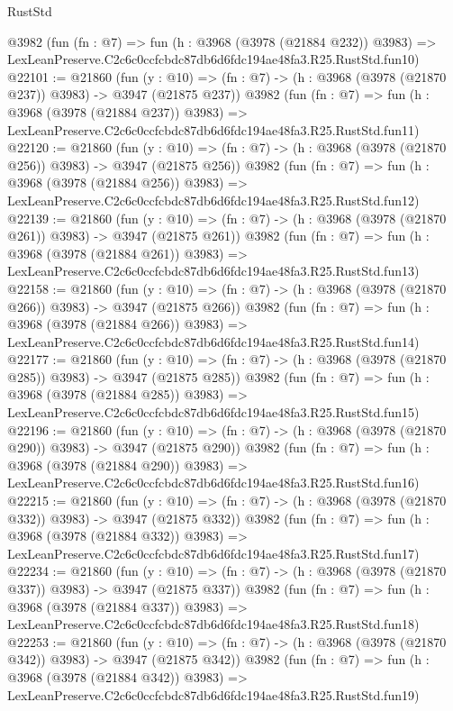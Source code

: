 \begin{lexlean}{RustStd}
\begin{coremodule}
    @3982
    (fun (fn : @7) =>
    fun (h : @3968 (@3978 (@21884 @232)) @3983) =>
    LexLeanPreserve.C2c6c0ccfcbdc87db6d6fdc194ae48fa3.R25.RustStd.fun10)
@22101 := @21860
    (fun (y : @10) => (fn : @7) -> (h : @3968 (@3978 (@21870 @237)) @3983) -> @3947 (@21875 @237))
    @3982
    (fun (fn : @7) =>
    fun (h : @3968 (@3978 (@21884 @237)) @3983) =>
    LexLeanPreserve.C2c6c0ccfcbdc87db6d6fdc194ae48fa3.R25.RustStd.fun11)
@22120 := @21860
    (fun (y : @10) => (fn : @7) -> (h : @3968 (@3978 (@21870 @256)) @3983) -> @3947 (@21875 @256))
    @3982
    (fun (fn : @7) =>
    fun (h : @3968 (@3978 (@21884 @256)) @3983) =>
    LexLeanPreserve.C2c6c0ccfcbdc87db6d6fdc194ae48fa3.R25.RustStd.fun12)
@22139 := @21860
    (fun (y : @10) => (fn : @7) -> (h : @3968 (@3978 (@21870 @261)) @3983) -> @3947 (@21875 @261))
    @3982
    (fun (fn : @7) =>
    fun (h : @3968 (@3978 (@21884 @261)) @3983) =>
    LexLeanPreserve.C2c6c0ccfcbdc87db6d6fdc194ae48fa3.R25.RustStd.fun13)
@22158 := @21860
    (fun (y : @10) => (fn : @7) -> (h : @3968 (@3978 (@21870 @266)) @3983) -> @3947 (@21875 @266))
    @3982
    (fun (fn : @7) =>
    fun (h : @3968 (@3978 (@21884 @266)) @3983) =>
    LexLeanPreserve.C2c6c0ccfcbdc87db6d6fdc194ae48fa3.R25.RustStd.fun14)
@22177 := @21860
    (fun (y : @10) => (fn : @7) -> (h : @3968 (@3978 (@21870 @285)) @3983) -> @3947 (@21875 @285))
    @3982
    (fun (fn : @7) =>
    fun (h : @3968 (@3978 (@21884 @285)) @3983) =>
    LexLeanPreserve.C2c6c0ccfcbdc87db6d6fdc194ae48fa3.R25.RustStd.fun15)
@22196 := @21860
    (fun (y : @10) => (fn : @7) -> (h : @3968 (@3978 (@21870 @290)) @3983) -> @3947 (@21875 @290))
    @3982
    (fun (fn : @7) =>
    fun (h : @3968 (@3978 (@21884 @290)) @3983) =>
    LexLeanPreserve.C2c6c0ccfcbdc87db6d6fdc194ae48fa3.R25.RustStd.fun16)
@22215 := @21860
    (fun (y : @10) => (fn : @7) -> (h : @3968 (@3978 (@21870 @332)) @3983) -> @3947 (@21875 @332))
    @3982
    (fun (fn : @7) =>
    fun (h : @3968 (@3978 (@21884 @332)) @3983) =>
    LexLeanPreserve.C2c6c0ccfcbdc87db6d6fdc194ae48fa3.R25.RustStd.fun17)
@22234 := @21860
    (fun (y : @10) => (fn : @7) -> (h : @3968 (@3978 (@21870 @337)) @3983) -> @3947 (@21875 @337))
    @3982
    (fun (fn : @7) =>
    fun (h : @3968 (@3978 (@21884 @337)) @3983) =>
    LexLeanPreserve.C2c6c0ccfcbdc87db6d6fdc194ae48fa3.R25.RustStd.fun18)
@22253 := @21860
    (fun (y : @10) => (fn : @7) -> (h : @3968 (@3978 (@21870 @342)) @3983) -> @3947 (@21875 @342))
    @3982
    (fun (fn : @7) =>
    fun (h : @3968 (@3978 (@21884 @342)) @3983) =>
    LexLeanPreserve.C2c6c0ccfcbdc87db6d6fdc194ae48fa3.R25.RustStd.fun19)

\end{coremodule}
\end{lexlean}
